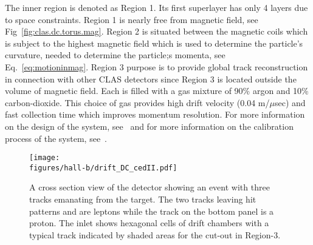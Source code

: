 The inner region is denoted as Region 1. Its first superlayer has only 4 layers due to space constraints. Region 1 is nearly free from magnetic field, see Fig~\ref{fig:clas.dc.torus.mag}. Region 2 is situated between the magnetic coils which is subject to the highest magnetic field which is used to determine the particle's curvature, needed to determine the particle;s momenta, see Eq.~\ref{eq:motioninmag}. Region 3 purpose is to provide global track reconstruction in connection with other CLAS detectors since Region 3 is located outside the volume of magnetic field. Each  is filled with a gas mixture of 90\% argon and 10\% carbon-dioxide. This choice of gas provides high drift velocity (0.04 m/$\mu$sec) and fast collection time which improves momentum resolution. For more information on the design of the   system, see~\cite{clas.dc} and for more information on the calibration process of the   system, see~\cite{clas.dc.calib}.

\begin{figure}\begin{center}
\texttt{[image: \\figures/hall-b/drift\_DC\_cedII.pdf]}
\caption[A cross section view of the  detector showing an event with three tracks emanating from the target]{\label{fig:clas.dc.drift}A cross section view of the  detector showing an event with three tracks emanating from the target. The two tracks leaving hit patterns  and  are leptons while the track on the bottom panel is a proton. The inlet shows hexagonal cells of drift chambers with a typical track indicated by shaded areas for the cut-out in Region-3.}
\end{center}\end{figure}

